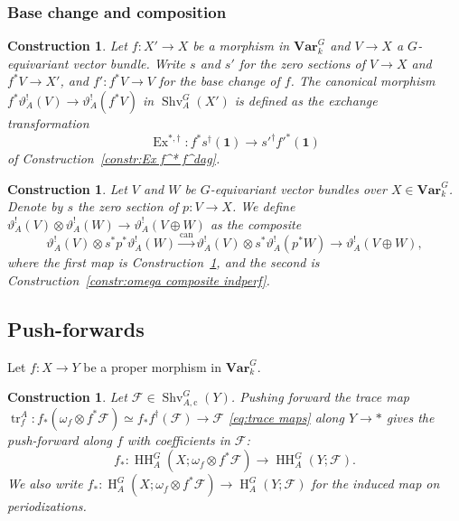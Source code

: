 \documentclass[12pt, oneside]{amsart}
\numberwithin{equation}{section}
\newtheorem{construction}[subsubsection]{Construction}
\theoremstyle{remark}
\theoremstyle{plain}
\newcommand{\Var}{\mathbf{Var}_{k}}
\newcommand{\HH}{\operatorname{HH}}
\newcommand{\Hcoh}{\operatorname{H}}
\newcommand{\Shv}{\operatorname{Shv}}
\newcommand{\un}{\mathbf{1}}
\newcommand{\cF}{\mathcal{F}}
\begin{document}
\subsubsection{Base change and composition}

\begin{construction}\label{constr:vartheta^! funct}
Let $f : X' \to X$ be a morphism in $\Var^G$ and $V \to X$ a $G$-equivariant vector bundle.
Write $s$ and $s'$ for the zero sections of $V \to X$ and $f^*V \to X'$, and $f' : f^*V \to V$ for the base change of $f$.
The canonical morphism $f^* \vartheta_A^!(V) \to \vartheta_A^!(f^*V)$ in $\Shv_A^G(X')$ is defined as the exchange transformation
\[
  \operatorname{Ex}^{*,\dag} : f^* s^\dag (\un) \to s'^\dag f'^* (\un)
\]
of Construction~\ref{constr:Ex f^* f^dag}.
\end{construction}

\begin{construction}\label{constr:vartheta^! sum}
Let $V$ and $W$ be $G$-equivariant vector bundles over $X \in \Var^G$.
Denote by $s$ the zero section of $p : V \to X$.
We define $\vartheta^!_A(V) \otimes \vartheta^!_A(W) \to \vartheta^!_A(V \oplus W)$ as the composite
\[
  \vartheta^!_A(V) \otimes s^*p^*\vartheta^!_A(W)
  \xrightarrow{\mathrm{can}} \vartheta^!_A(V) \otimes s^*\vartheta^!_A(p^*W)
  \to \vartheta^!_A(V \oplus W),
\]
where the first map is Construction~\ref{constr:vartheta^! funct}, and the second is Construction~\ref{constr:omega composite indperf}.
\end{construction}

\subsection{Push-forwards}
\label{ssec:pushforwards}

Let $f : X \to Y$ be a proper morphism in $\Var^G$.

\begin{construction}\label{push}
Let $\cF \in \Shv_{A,\mathrm{c}}^G(Y)$.
Pushing forward the trace map $\operatorname{tr}^A_f : f_*(\omega_f \otimes f^*\cF) \simeq f_* f^\dag(\cF) \to \cF$ \eqref{eq:trace maps} along $Y \to *$ gives the \emph{push-forward} along $f$ with coefficients in $\cF$:
\[
  f_* : \HH_A^G(X; \omega_f \otimes f^*\cF) \longrightarrow \HH_A^G(Y; \cF).
\]
We also write $f_* : \Hcoh_A^G(X; \omega_f \otimes f^*\cF) \longrightarrow \Hcoh_A^G(Y; \cF)$ for the induced map on periodizations.
\end{construction}
\end{document}
